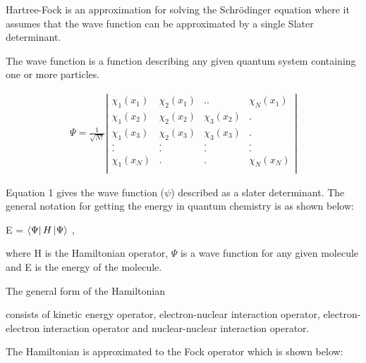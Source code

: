 \documentclass[twoside]{article}
\begin{document}
 Hartree-Fock is an approximation for solving the Schrödinger equation 
where it assumes that the wave function can be approximated by a single Slater determinant.  

The wave function is a function describing any given quantum system containing one or more particles. 



\begin{eqnarray}
\Psi=
\frac{1}{\sqrt{N!}}\left|
\begin{array}{cccc}
\chi_1(x_1)&\chi_2(x_1)&..&\chi_N(x_1)\\
\chi_1(x_2)&\chi_2(x_2)&\chi_3(x_2)&.\\
\chi_1(x_3)&\chi_2(x_3)&\chi_3(x_3)&.\\
.&.&.&.\\
.&.&.&.\\
\chi_1(x_N)&.&.&\chi_N(x_N)\\
\end{array}
\right|
\end{eqnarray}


Equation 1 gives the wave function ($\psi$) described as a slater determinant. The general notation for getting the energy in quantum chemistry is as shown below:


E = $\Bra{\Psi}H\Ket{\Psi}$ ,

where H is the Hamiltonian operator, $\Psi$ is a wave function for any given molecule and E is the energy of the molecule. 

The general form of the Hamiltonian 

consists of kinetic energy operator, electron-nuclear interaction operator, electron-electron interaction operator and nuclear-nuclear interaction operator.

 The Hamiltonian is approximated to the Fock operator which is shown below:
\end{document}
